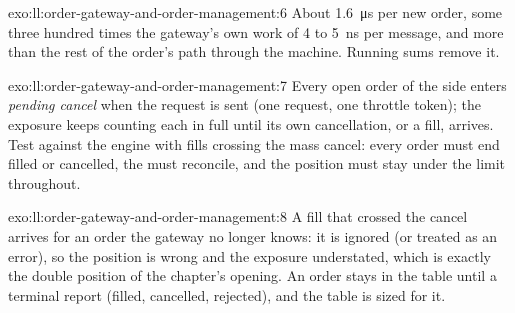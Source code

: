 \begin{solution}{exo:ll:order-gateway-and-order-management:6}
About \qty{1.6}{\micro\second} per new order, some three hundred times the gateway's own work of 4 to \qty{5}{\nano\second} per
message, and more than the rest of the order's path through the machine. Running sums remove it.
\end{solution}

\begin{solution}{exo:ll:order-gateway-and-order-management:7}
Every open order of the side enters \emph{pending cancel} when the request is sent (one request, one throttle token); the
exposure keeps counting each in full until its own cancellation, or a fill, arrives. Test against the engine with fills
crossing the mass cancel: every order must end filled or cancelled, the  must reconcile, and the position must stay
under the limit throughout.
\end{solution}

\begin{solution}{exo:ll:order-gateway-and-order-management:8}
A fill that crossed the cancel arrives for an order the gateway no longer knows: it is ignored (or treated as an error), so
the position is wrong and the exposure understated, which is exactly the double position of the chapter's opening. An order
stays in the table until a terminal report (filled, cancelled, rejected), and the table is sized for it.
\end{solution}

